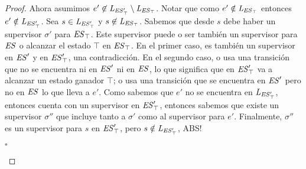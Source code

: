 \begin{proof}
Ahora asumimos $e' \not\in \mathit{L_{\mathit{\mathit{ES}'_{\top}}}} \setminus \mathit{L_{\mathit{\mathit{ES}_{\top}}}}$. Notar que como $e' \notin \mathit{L_{\mathit{\mathit{ES}_{\top}}}}$ entonces $e' \notin \mathit{L_{\mathit{\mathit{ES}'_{\top}}}}$. Sea $s \in \mathit{L_{\mathit{\mathit{ES}'_{\top}}}}$ y $s \not\in \mathit{L_{\mathit{\mathit{ES}_{\top}}}}$. Sabemos que desde $s$ debe haber un supervisor $\sigma'$ para  $\mathit{\mathit{ES}_{\top}}$. Este supervisor puede o ser también un supervisor para $\mathit{ES}$ o alcanzar el estado $\top$ en $\mathit{\mathit{ES}_{\top}}$. En el primer caso, es también un supervisor en $\mathit{ES}'$ y en $\mathit{\mathit{ES}'_{\top}}$, una contradicción. En el segundo caso, o usa una transición que no se encuentra ni en $\mathit{ES}'$ ni en $\mathit{ES}$, lo que significa que en $\mathit{\mathit{ES}'_{\top}}$ va a alcanzar un estado ganador $\top$; o usa una transición que se encuentra en $\mathit{ES}'$ pero no en $\mathit{ES}$ lo que lleva a $e'$. Como sabemos que $e'$ no se encuentra en $\mathit{L_{\mathit{\mathit{ES}'_{\top}}}}$, entonces cuenta con un supervisor en  $\mathit{\mathit{ES}'_{\top}}$, entonces sabemos que existe un supervisor $\sigma''$ que incluye tanto a  $\sigma'$ como al supervisor para $e'$. Finalmente, $\sigma''$ es un supervisor para $s$ en  $\mathit{\mathit{ES}'_{\top}}$, pero $s \notin \mathit{L_{\mathit{\mathit{ES}'_{\top}}}}$, ABS!	
\begin{flushright}
	$\square$
\end{flushright}
\end{proof}

